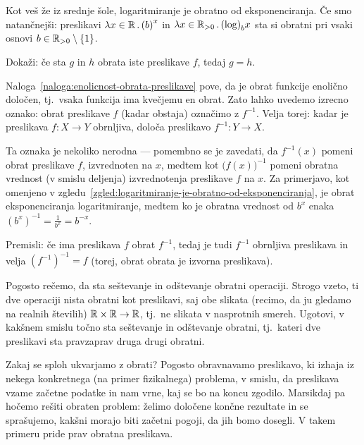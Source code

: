 \begin{zgled}\label{zgled:logaritmiranje-je-obratno-od-eksponenciranja}
Kot veš že iz srednje šole, logaritmiranje je obratno od eksponenciranja. Če smo natančnejši: preslikavi $\lam{x \in \RR}  b^x$ in $\lam{x \in \RR_{>0}} \log_b x$ sta si obratni pri vsaki osnovi $b \in \RR_{> 0} \setminus \set{1}$.
\end{zgled}

\begin{naloga}\label{naloga:enolicnost-obrata-preslikave}
Dokaži: če sta $g$ in $h$ obrata iste preslikave $f$, tedaj $g = h$.
\end{naloga}

Naloga~\ref{naloga:enolicnost-obrata-preslikave} pove, da je obrat funkcije enolično določen, tj.~vsaka funkcija ima kvečjemu en obrat. Zato lahko uvedemo izrecno oznako: obrat preslikave $f$ (kadar obstaja) označimo z $f^{-1}$. Velja torej: kadar je preslikava $f\colon X \to Y$ obrnljiva, določa preslikavo $f^{-1}\colon Y \to X$.

Ta oznaka je nekoliko nerodna --- pomembno se je zavedati, da $f^{-1}(x)$ pomeni obrat preslikave $f$, izvrednoten na $x$, medtem kot $\big(f(x)\big)^{-1}$ pomeni obratna vrednost (v smislu deljenja) izvrednotenja preslikave $f$ na $x$. Za primerjavo, kot omenjeno v zgledu~\ref{zgled:logaritmiranje-je-obratno-od-eksponenciranja}, je obrat eksponenciranja logaritmiranje, medtem ko je obratna vrednost od $b^x$ enaka $(b^x)^{-1} = \frac{1}{b^x} = b^{-x}$.

\begin{naloga}
Premisli: če ima preslikava $f$ obrat $f^{-1}$, tedaj je tudi $f^{-1}$ obrnljiva preslikava in velja $(f^{-1})^{-1} = f$ (torej, obrat obrata je izvorna preslikava).
\end{naloga}

\begin{naloga}
Pogosto rečemo, da sta seštevanje in odštevanje obratni operaciji. Strogo vzeto, ti dve operaciji nista obratni kot preslikavi, saj obe slikata (recimo, da ju gledamo na realnih številih) $\mathbb{R} \times \mathbb{R} \to \mathbb{R}$, tj.~ne slikata v nasprotnih smereh. Ugotovi, v kakšnem smislu točno sta seštevanje in odštevanje obratni, tj.~kateri dve preslikavi sta pravzaprav druga drugi obratni.
\end{naloga}

Zakaj se sploh ukvarjamo z obrati? Pogosto obravnavamo preslikavo, ki izhaja iz nekega konkretnega (na primer fizikalnega) problema, v smislu, da preslikava vzame začetne podatke in nam vrne, kaj se bo na koncu zgodilo. Marsikdaj pa hočemo rešiti obraten problem: želimo določene končne rezultate in se sprašujemo, kakšni morajo biti začetni pogoji, da jih bomo dosegli. V takem primeru pride prav obratna preslikava.

